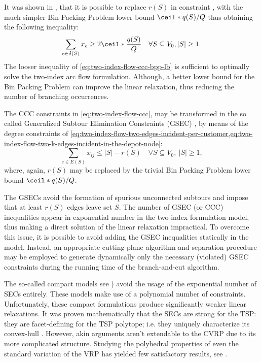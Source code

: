 It was shown in \textcite{martello1990knapsack, cornuejols1993}, that it is possible to replace $r(S)$ in constraint
, with the much simpler Bin Packing Problem lower bound $\ceil*{q(S) / Q}$
thus obtaining the following inequality:
\begin{equation}
	\label{eq:two-index-flow-ccc-bpp-lb}
	\sum_{e \in \delta(S)} x_e \ge 2 \ceil*{\frac{q(S)}{Q}}   \quad \forall S \subseteq V_0, |S| \ge 1.
\end{equation}
The looser inequality of \cref{eq:two-index-flow-ccc-bpp-lb} is sufficient to optimally solve
the two-index arc flow formulation.
Although, a better lower bound for the Bin Packing Problem can improve the linear
relaxation, thus reducing the number of branching occurrences.

The CCC constraints in \cref{eq:two-index-flow-ccc},
may be transformed in the so called Generalized Subtour Elimination Constraints (GSEC) \parencite{laporte1985},
by means of the degree constraints of \cref{eq:two-index-flow-two-edges-incident-per-customer,eq:two-index-flow-two-k-edges-incident-in-the-depot-node}:
\begin{equation}\label{eq:cvrp-2flow-gsec}
	\sum_{e \in E(S)} x_{ij} \le |S| - r(S) \quad \forall S \subseteq V_0,\ |S| \ge 1,
\end{equation}
where, again, $r(S)$ may be replaced by the trivial Bin Packing Problem lower bound $\ceil*{q(S) / Q}$.

The GSECs avoid the formation of spurious unconnected subtours and impose that at least $r(S)$ edges leave set $S$.
The number of GSEC (or CCC) inequalities appear in exponential number in the two-index formulation model,
thus making a direct solution of the linear relaxation impractical.
To overcome this issue, it is possible to avoid adding the GSEC inequalities statically in the model.
Instead, an appropriate cutting-plane algorithm and separation procedure may be employed to generate dynamically
only the necessary (violated) GSEC constraints
during the running time of the branch-and-cut algorithm.

The so-called compact models see \cite{miller1960, christofides1979vehicle, desrochers1991})
avoid the usage of the exponential number of SECs entirely.
These models make use of a polynomial number of constraints.
Unfortunately, these compact formulations produce significantly weaker linear relaxations.
It was proven mathematically
that the SECs are strong for the TSP: they are facet-defining for the TSP polytope;
i.e. they uniquely characterize its convex-hull \parencite{grotschel1975}.
However, akin arguments aren't extendable to the CVRP due to its more complicated structure.
Studying the polyhedral properties of even the standard variation of the VRP
has yielded few satisfactory results, see \textcite{campos1991, cornuejols1993}.

